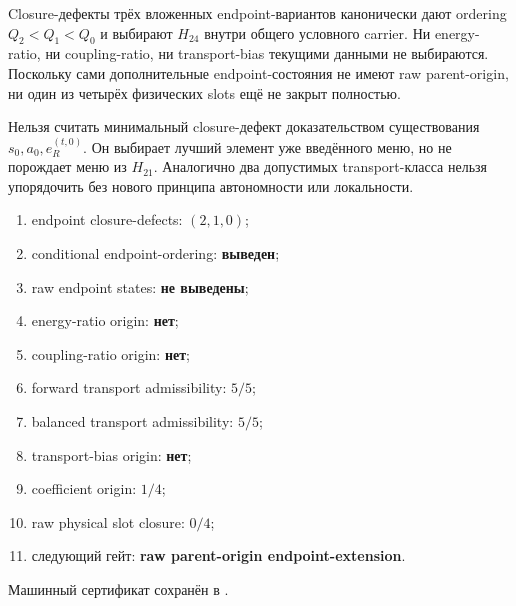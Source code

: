 \begin{theorem}
Closure-дефекты трёх вложенных endpoint-вариантов канонически дают ordering
$Q_2<Q_1<Q_0$ и выбирают $H_{24}$ внутри общего условного carrier. Ни
energy-ratio, ни coupling-ratio, ни transport-bias текущими данными не
выбираются. Поскольку сами дополнительные endpoint-состояния не имеют raw
parent-origin, ни один из четырёх физических slots ещё не закрыт полностью.
\end{theorem}

\begin{nogocriterion}
Нельзя считать минимальный closure-дефект доказательством существования
$s_0,a_0,e_R^{(t,0)}$. Он выбирает лучший элемент уже введённого меню, но
не порождает меню из $H_{21}$. Аналогично два допустимых transport-класса
нельзя упорядочить без нового принципа автономности или локальности.
\end{nogocriterion}

\begin{protocol}\begin{enumerate}
\item endpoint closure-defects: \textbf{$(2,1,0)$};
\item conditional endpoint-ordering: \textbf{выведен};
\item raw endpoint states: \textbf{не выведены};
\item energy-ratio origin: \textbf{нет};
\item coupling-ratio origin: \textbf{нет};
\item forward transport admissibility: \textbf{$5/5$};
\item balanced transport admissibility: \textbf{$5/5$};
\item transport-bias origin: \textbf{нет};
\item coefficient origin: \textbf{$1/4$};
\item raw physical slot closure: \textbf{$0/4$};
\item следующий гейт: \textbf{raw parent-origin endpoint-extension}.
\end{enumerate}\end{protocol}

Машинный сертификат сохранён в
.